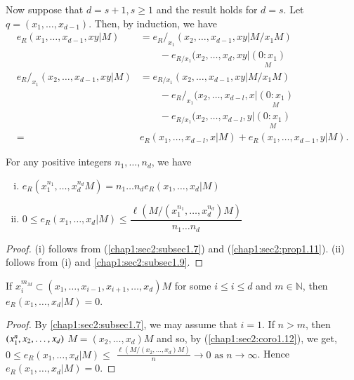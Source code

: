  Now suppose that $d=s+1, s \geq 1$ and the result holds for
 $d=s$. Let $q=(x_1, \ldots, x_{d-1})$. Then, by induction, we have 
 \begin{align*}
 e_R(x_1, \ldots,  x_{d-1}, xy|M) & = e_R/_{x_1}(x_2, \ldots,  x_{d-1},
 xy|M/ x_1 M)\\ 
 & \qquad -e_{R/x_1}(x_2, \ldots,  x_d, xy| \underset{M}{(0:x_1)}\\
   e_R/_{x_1}(x_2, \ldots, x_{d-1}, xy|M)& = e_{R/x_1}(x_2, \ldots,
   x_{d-1}, xy|M/ x_1M)\\ 
   & \qquad -e_R/_{x_1}(x_2, \ldots,  x_{d-l}, x|
   \underset{M}{(0:x_1)}\\
   & \qquad -e_{R/ x_1} (x_2, \ldots,  x_{d-l}, y| \underset{M}{(0:x_1)}\\ 
   =& e_R(x_1, \ldots,  x_{d-l}, x|M) + e_R(x_1, \ldots, x_{d-1}, y|M).
 \end{align*}

\setcounter{corollary}{11}
\begin{corollary}\label{chap1:sec2:coro1.12}
  For any positive integers $n_1, \ldots,  n_d$, we have
  \begin{enumerate}[(i)]
  \item $e_R(x_1^{n_1},  \ldots,  x_d^{n_d} M) = n_1 \ldots n_d e_R(x_1,
    \ldots,  x_d|M)$ \pageoriginale 
  \item $0 \leq e_R(x_1, \ldots, x_d|M) \leq \dfrac{\ell (M/(x_1^{n_1},
    \ldots,  x_d^{n_d})M)}{n_1 \ldots n_d}$ 
  \end{enumerate}
\end{corollary}

 \begin{proof}
   (i) follows from (\ref{chap1:sec2:subsec1.7})
   and (\ref{chap1:sec2:prop1.11}). (ii) follows from (i)
   and \ref{chap1:sec2:subsec1.9}.
 \end{proof} 
 
\setcounter{corollary}{12}
\begin{corollary}\label{chap1:sec2:coro1.13}
  If $x_i^{m_{M}} \subset (x_1, \ldots, x_{i-1}, x_{i+1},  \ldots,
  x_d)M$ for some $i \leq i \leq d$ and $m \in \mathds{N}$,
  then $ e_R(x_1, \ldots,  x_d |M)=0 $. 
\end{corollary}

\begin{proof}
  By \ref{chap1:sec2:subsec1.7}, we may assume that $i=1$. If $n>m$,
  then $(x_1^n, x_2, 
  \ldots,\break  x_d)$ $M=(x_2, \ldots,  x_d)M$ and so, by
  (\ref{chap1:sec2:coro1.12}), we get,   
  $ 0 \leq e_R(x_1, \ldots, x_d|M) \leq$ $\frac{\ell(M/(x_2, \ldots,
    x_d)M)}{n} \rightarrow 0 \text{ as } n \rightarrow \infty $. Hence
  $e_R(x_1, \ldots,  x_d|M)=0$.
 \end{proof} 
 
